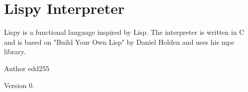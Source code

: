 \chapter{Lispy Interpreter}
\hypertarget{index}{}\label{index}
Lispy is a functional language inspired by Lisp. The interpreter is written in C and is based on "{}\+Build Your Own Lisp"{} by Daniel Holden and uses his mpc library.

\begin{DoxyAuthor}{Author}
edd255 
\end{DoxyAuthor}
\begin{DoxyVersion}{Version}
0. 
\end{DoxyVersion}
